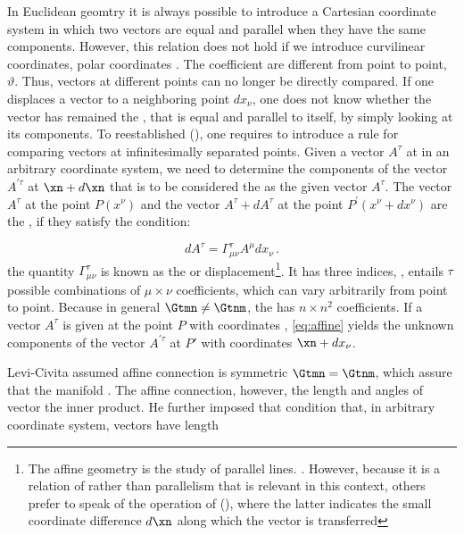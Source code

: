 {In Euclidean geomtry it is always possible to introduce a Cartesian coordinate system in which two vectors are equal and parallel when they have the same components. However, this relation does not hold if we introduce curvilinear coordinates, \eg polar coordinates \citep[028-01-03, 35]{HR}. The coefficient are different from point to point, $\vartheta$. Thus, vectors at different points can no longer be directly compared. If one displaces a vector to a neighboring point $dx_\nu$, one does not know whether the vector has remained the , that is equal and parallel to itself, by simply looking at its components. To reestablished  (), one requires to introduce a rule for comparing vectors at infinitesimally separated points. Given a vector $A^\tau$ at \xn in an arbitrary coordinate system, we need to determine the components of the vector $A^{\prime\tau}$ at $\xn+d\xn$ that is to be considered the  as the given vector $A^\tau$. The vector $A^{\tau}$ at the point $P\left(x^{\nu}\right)$ and the vector $A^{\tau}+d A^{\tau}$ at the point $P^{\prime}\left(x^{\nu}+d x^{\nu}\right)$ are the , if they satisfy the condition:

\begin{equation}\label{eq:affine}
dA^\tau = \Gamma^\tau_{\mu\nu}A^{\mu} dx_\nu\,.
\end{equation}
%
the  quantity $\Gamma^\tau_{\mu\nu}$ is known as the  or displacement\footnote{The affine geometry is the study of parallel lines. \citet{Weyl1918b}. However, because it is a relation of  rather than parallelism that is relevant in this context, others prefer to speak of the operation of  (), where the latter indicates the small coordinate difference $d\xn$ along which the vector is transferred}. It has three indices, \ie, entails $\tau$ possible combinations of $\mu \times \nu$ coefficients, which can vary arbitrarily from point to point. Because in general $\Gtmn \neq \Gtnm$, the \Gtmn has $n \times n^2$ coefficients. If a vector $A^\tau$ is given at the point $P$ with coordinates \xn, \cref{eq:affine} yields the unknown components of the vector $A^{\prime\tau}$ at $P'$ with coordinates $\xn+dx_\nu$.

Levi-Civita assumed affine connection is symmetric $\Gtmn=\Gtnm$, which assure that the manifold . The affine connection, however, the length and angles of vector the inner product. He further imposed that condition that, in arbitrary coordinate system, vectors have length

}
